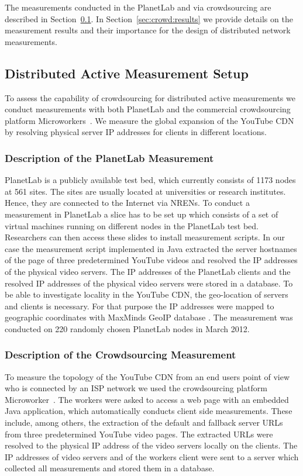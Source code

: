The measurements conducted in the PlanetLab and via crowdsourcing are described in Section~\ref{sec:crowd:method}.
In Section~\ref{sec:crowd:results} we provide details on the measurement results and their importance for the design of distributed network measurements.

%
\subsection{Distributed Active Measurement Setup}
\label{sec:crowd:method}

To assess the capability of crowdsourcing for distributed active measurements we conduct measurements with both  PlanetLab and the commercial crowdsourcing platform Microworkers~\cite{microworkers}.
We measure the global expansion of the YouTube CDN by resolving physical server IP addresses for clients in different locations.

\subsubsection{Description of the PlanetLab Measurement}

PlanetLab is a publicly available test bed, which currently consists of 1173 nodes at 561 sites.
The sites are usually located at universities or research institutes.
Hence, they are connected to the Internet via NRENs.
To conduct a measurement in PlanetLab a slice has to be set up which consists of a set of virtual machines running on different nodes in the PlanetLab test bed.
Researchers can then access these slides to install measurement scripts.
In our case the measurement script implemented in Java extracted the server hostnames of the page of three predetermined YouTube videos and resolved the IP addresses of the physical video servers.
The IP addresses of the PlanetLab clients and the resolved IP addresses of the physical video servers were stored in a database.
To be able to investigate locality in the YouTube CDN, the geo-location of servers and clients is necessary.
For that purpose the IP addresses were mapped to geographic coordinates with MaxMinds GeoIP database \cite{geolite}.
The measurement was conducted on 220 randomly chosen PlanetLab nodes in March 2012.

\subsubsection{Description of the Crowdsourcing Measurement}
To measure the topology of the YouTube CDN from an end users point of view who is connected by an ISP network we used the crowdsourcing platform Microworker~\cite{microworkers}.
The workers were asked to access a web page with an embedded Java application, which automatically conducts client side measurements.
These include, among others, the extraction of the default and fallback server URLs from three predetermined YouTube video pages.
The extracted URLs were resolved to the physical IP address of the video servers locally on the clients.
The IP addresses of video servers and of the workers client were sent to a server which collected all measurements and stored them in a database.

